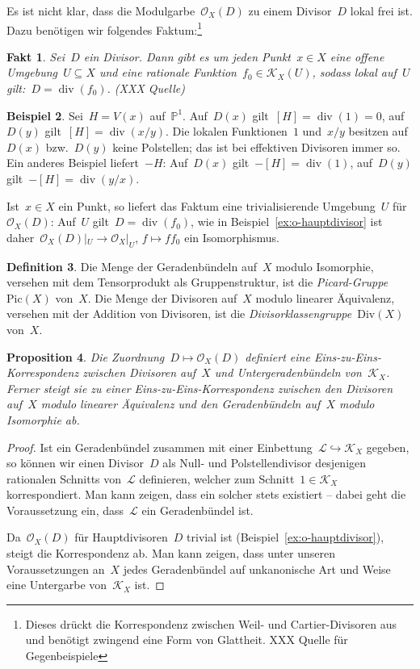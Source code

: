 \documentclass[a4paper,ngerman,12pt]{scrartcl}
\theoremstyle{definition}
\newtheorem{defn}{Definition}[section]
\newtheorem{ex}[defn]{Beispiel}
\theoremstyle{plain}
\newtheorem{prop}[defn]{Proposition}
\newtheorem{fact}[defn]{Fakt}
\theoremstyle{remark}
\newcommand{\PP}{\mathbb{P}}
\newcommand{\K}{\mathcal{K}}
\renewcommand{\L}{\mathcal{L}}
\renewcommand{\O}{\mathcal{O}}
\newcommand{\Pic}{\mathrm{Pic}}
\renewcommand{\div}{\operatorname{div}}
\newcommand{\Div}{\mathrm{Div}}
\begin{document}
Es ist nicht klar, dass die Modulgarbe~$\O_X(D)$ zu einem Divisor~$D$ lokal
frei ist. Dazu benötigen wir folgendes Faktum:\footnote{Dieses drückt die
Korrespondenz zwischen Weil- und Cartier-Divisoren aus und benötigt zwingend
eine Form von Glattheit. XXX Quelle für Gegenbeispiele}

\begin{fact}Sei~$D$ ein Divisor. Dann gibt es um jeden Punkt~$x \in X$ eine
offene Umgebung~$U \subseteq X$ und eine rationale Funktion~$f_0 \in \K_X(U)$,
sodass lokal auf~$U$ gilt:~$D = \div(f_0)$. (XXX Quelle)
\end{fact}

\begin{ex}Sei~$H = V(x)$ auf~$\PP^1$. Auf~$D(x)$ gilt~$[H] = \div(1) = 0$,
auf~$D(y)$ gilt~$[H] = \div(x/y)$. Die lokalen Funktionen~$1$ und~$x/y$
besitzen auf~$D(x)$ bzw.~$D(y)$ keine Polstellen; das ist bei effektiven
Divisoren immer so. Ein anderes Beispiel liefert~$-H$: Auf~$D(x)$ gilt~$-[H] =
\div(1)$, auf~$D(y)$ gilt~$-[H] = \div(y/x)$.\end{ex}

Ist~$x \in X$ ein Punkt, so liefert das Faktum eine trivialisierende
Umgebung~$U$ für~$\O_X(D)$: Auf~$U$ gilt~$D = \div(f_0)$, wie in
Beispiel~\ref{ex:o-hauptdivisor} ist daher~$\O_X(D)|_U \to \O_X|_U$, $f \mapsto
f f_0$ ein Isomorphismus.

\begin{defn}Die Menge der Geradenbündeln
auf~$X$ modulo Isomorphie, versehen mit dem Tensorprodukt als Gruppenstruktur,
ist die \emph{Picard-Gruppe}~$\Pic(X)$ von~$X$. Die Menge der Divisoren auf~$X$
modulo linearer Äquivalenz, versehen mit der Addition von Divisoren, ist die
\emph{Divisorklassengruppe}~$\Div(X)$ von~$X$.
\end{defn}

\begin{prop}Die Zuordnung~$D \mapsto \O_X(D)$ definiert eine
Eins-zu-Eins-Korres\-pon\-denz zwischen Divisoren auf~$X$ und Untergeradenbündeln
von~$\K_X$. Ferner steigt sie zu einer Eins-zu-Eins-Korrespondenz zwischen
den Divisoren auf~$X$ modulo linearer Äquivalenz und den Geradenbündeln
auf~$X$ modulo Isomorphie ab.
\end{prop}
\begin{proof}Ist ein Geradenbündel zusammen mit einer Einbettung~$\L
\hookrightarrow \K_X$ gegeben, so können wir einen Divisor~$D$ als Null- und
Polstellendivisor desjenigen rationalen Schnitts von~$\L$ definieren, welcher
zum Schnitt~$1 \in \K_X$ korrespondiert. Man kann zeigen, dass ein
solcher stets existiert -- dabei geht die Voraussetzung ein, dass~$\L$ ein
Geradenbündel ist.

Da~$\O_X(D)$ für Hauptdivisoren~$D$ trivial ist
(Beispiel~\ref{ex:o-hauptdivisor}), steigt die Korrespondenz ab. Man kann
zeigen, dass unter unseren Voraussetzungen an~$X$ jedes Geradenbündel auf
unkanonische Art und Weise eine Untergarbe von~$\K_X$ ist.
\end{proof}
\end{document}
